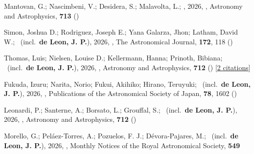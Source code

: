 \item[{\color{numcolor}\scriptsize98}] Mantovan, G.; Nascimbeni, V.; Desidera, S.; Malavolta, L.; \etal, 2026, , Astronomy and Astrophysics, \textbf{713} ()

\item[{\color{numcolor}\scriptsize97}] Simon, Joshua D.; Rodriguez, Joseph E.; Yana Galarza, Jhon; Latham, David W.; \etal\ (incl.\ \textbf{de Leon, J. P.}), 2026, , The Astronomical Journal, \textbf{172}, 118 ()

\item[{\color{numcolor}\scriptsize96}] Thomas, Luis; Nielsen, Louise D.; Kellermann, Hanna; Prinoth, Bibiana; \etal\ (incl.\ \textbf{de Leon, J. P.}), 2026, , Astronomy and Astrophysics, \textbf{712} () [\href{https://ui.adsabs.harvard.edu/abs/2026A&A...712A.157T}{2 citations}]

\item[{\color{numcolor}\scriptsize95}] Fukuda, Izuru; Narita, Norio; Fukui, Akihiko; Hirano, Teruyuki; \etal\ (incl.\ \textbf{de Leon, J. P.}), 2026, , Publications of the Astronomical Society of Japan, \textbf{78}, 1602 ()

\item[{\color{numcolor}\scriptsize94}] Leonardi, P.; Santerne, A.; Borsato, L.; Grouffal, S.; \etal\ (incl.\ \textbf{de Leon, J. P.}), 2026, , Astronomy and Astrophysics, \textbf{712} ()

\item[{\color{numcolor}\scriptsize93}] Morello, G.; Pel{\'a}ez-Torres, A.; Pozuelos, F. J.; D{\'e}vora-Pajares, M.; \etal\ (incl.\ \textbf{de Leon, J. P.}), 2026, , Monthly Notices of the Royal Astronomical Society, \textbf{549}

